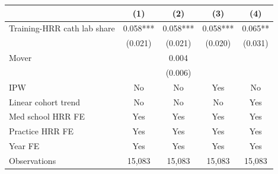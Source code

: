 \begin{tabular}{lcccc}
\toprule
 & (1) & (2) & (3) & (4) \\
\midrule
Training-HRR cath lab share & 0.058*** & 0.058*** & 0.058*** & 0.065** \\
 & (0.021) & (0.021) & (0.020) & (0.031) \\
Mover & & 0.004 & & \\
 & & (0.006) & & \\
\midrule
IPW & No & No & Yes & No \\
Linear cohort trend & No & No & No & Yes \\
Med school HRR FE & Yes & Yes & Yes & Yes \\
Practice HRR FE & Yes & Yes & Yes & Yes \\
Year FE & Yes & Yes & Yes & Yes \\
Observations & 15,083 & 15,083 & 15,083 & 15,083 \\
\bottomrule
\end{tabular}

